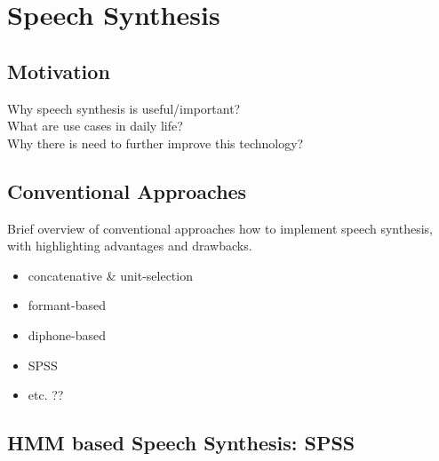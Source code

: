 

\section{Speech Synthesis}
\label{sec:speech}

\subsection{Motivation}
\label{subsec:motspeech}

Why speech synthesis is useful/important?\\What are use cases in daily life?\\Why there is need to further improve this technology?

\subsection{Conventional Approaches}
\label{subsec:convenspeech}

Brief overview of conventional approaches how to implement speech synthesis, with highlighting advantages and drawbacks.

\begin{itemize}[leftmargin=10pt]
	\item concatenative \& unit-selection
	\item formant-based
	\item diphone-based
	\item \ac{SPSS}
	\item etc. ??
\end{itemize}

\subsection{HMM based Speech Synthesis: \ac{SPSS}}
\label{subsec:hmmspeech}

